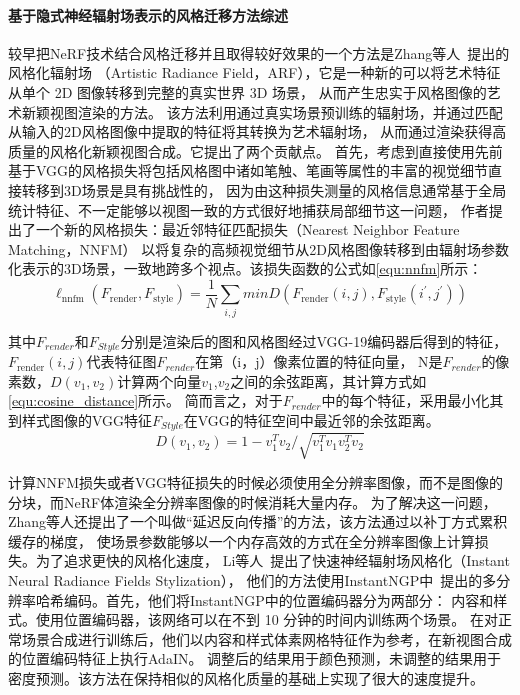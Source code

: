 \paragraph{基于隐式神经辐射场表示的风格迁移方法综述}
较早把NeRF技术结合风格迁移并且取得较好效果的一个方法是Zhang等人~\cite{zhang2022arf}提出的风格化辐射场
（Artistic Radiance Field，ARF），它是一种新的可以将艺术特征从单个 2D 图像转移到完整的真实世界 3D 场景，
从而产生忠实于风格图像的艺术新颖视图渲染的方法。
该方法利用通过真实场景预训练的辐射场，并通过匹配从输入的2D风格图像中提取的特征将其转换为艺术辐射场，
从而通过渲染获得高质量的风格化新颖视图合成。它提出了两个贡献点。
首先，考虑到直接使用先前基于VGG的风格损失将包括风格图中诸如笔触、笔画等属性的丰富的视觉细节直接转移到3D场景是具有挑战性的，
因为由这种损失测量的风格信息通常基于全局统计特征、不一定能够以视图一致的方式很好地捕获局部细节这一问题，
作者提出了一个新的风格损失：最近邻特征匹配损失（Nearest Neighbor Feature Matching，NNFM）
以将复杂的高频视觉细节从2D风格图像转移到由辐射场参数化表示的3D场景，一致地跨多个视点。该损失函数的公式如\autoref{equ:nnfm}所示：
\begin{equation}
    \label{equ:nnfm}
    \ell_{\mathrm{nnfm}}(F_{\mathrm{render}},F_{\mathrm{style}})=\frac1N\sum_{i,j}minD(F_{\mathrm{render}}(i,j),F_{\mathrm{style}}(i^{\prime},j^{\prime}))
\end{equation}

其中$F_{render}$和$F_{Style}$分别是渲染后的图和风格图经过VGG-19编码器后得到的特征，
$F_{\mathrm{render}}(i,j)$代表特征图$F_{render}$在第（i，j）像素位置的特征向量，
N是$F_{render}$的像素数，$D(v_1,v_2)$计算两个向量$v_1$,$v_2$之间的余弦距离，其计算方式如\autoref{equ:cosine_distance}所示。
简而言之，对于$F_{render}$中的每个特征，采用最小化其到样式图像的VGG特征$F_{Style}$在VGG的特征空间中最近邻的余弦距离。
\begin{equation}
    \label{equ:cosine_distance}
    D(v_1,v_2)=1-v_1^Tv_2/\sqrt{v_1^Tv_1v_2^Tv_2}
\end{equation}


计算NNFM损失或者VGG特征损失的时候必须使用全分辨率图像，而不是图像的分块，而NeRF体渲染全分辨率图像的时候消耗大量内存。
为了解决这一问题，Zhang等人还提出了一个叫做“延迟反向传播”的方法，该方法通过以补丁方式累积缓存的梯度，
使场景参数能够以一个内存高效的方式在全分辨率图像上计算损失。为了追求更快的风格化速度，
Li等人~\cite{li2023instant}提出了快速神经辐射场风格化（Instant Neural Radiance Fields Stylization），
他们的方法使用InstantNGP中~\cite{muller2022instant}提出的多分辨率哈希编码。首先，他们将InstantNGP中的位置编码器分为两部分：
内容和样式。使用位置编码器，该网络可以在不到 10 分钟的时间内训练两个场景。
在对正常场景合成进行训练后，他们以内容和样式体素网格特征作为参考，在新视图合成的位置编码特征上执行AdaIN。
调整后的结果用于颜色预测，未调整的结果用于密度预测。该方法在保持相似的风格化质量的基础上实现了很大的速度提升。

